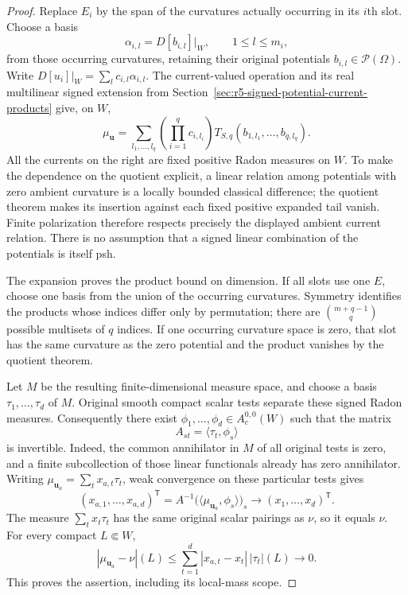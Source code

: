 \documentclass[11pt,a4paper]{article}
\numberwithin{equation}{section}
\theoremstyle{definition}
\theoremstyle{remark}
\begin{document}
\begin{proof}
Replace $E_i$ by the span of the curvatures actually occurring
in its $i$th slot.  Choose a basis
\[
       \alpha_{i,l}=D[b_{i,l}]|_W,\qquad1\le l\le m_i,
\]
from those occurring curvatures, retaining their original
potentials $b_{i,l}\in\mathcal P(\Omega)$.  Write
$D[u_i]|_W=\sum_l c_{i,l}\alpha_{i,l}$.
The current-valued operation and its real multilinear signed
extension from Section~\ref{sec:r5-signed-potential-current-products}
give, on $W$,
\begin{equation}
 \mu_{\mathbf u}
   =\sum_{l_1,\ldots,l_q}
        \left(\prod_{i=1}^q c_{i,l_i}\right)
        T_{S,q}(b_{1,l_1},\ldots,b_{q,l_q}).
 \label{eq:r5-finite-curvature-expansion}
\end{equation}
All the currents on the right are fixed positive Radon
measures on $W$.  To make the dependence on the quotient
explicit, a linear relation among potentials with zero
ambient curvature is a locally bounded classical difference;
the quotient theorem makes its insertion against each fixed
positive expanded tail vanish.  Finite polarization therefore
respects precisely the displayed ambient current relation.
There is no assumption that a signed linear combination of
the potentials is itself psh.

The expansion proves the product bound on dimension.  If all
slots use one $E$, choose one basis from the union of the
occurring curvatures.  Symmetry identifies the products whose
indices differ only by permutation; there are
$\binom{m+q-1}{q}$ possible multisets of $q$ indices.
If one occurring curvature space is zero, that slot has the
same curvature as the zero potential and the product vanishes
by the quotient theorem.

Let $M$ be the resulting finite-dimensional measure space,
and choose a basis $\tau_1,\ldots,\tau_d$ of $M$.
Original smooth compact scalar tests separate these signed
Radon measures.  Consequently there exist
$\phi_1,\ldots,\phi_d\in A_c^{0,0}(W)$ such that the matrix
\[
                   A_{st}=\langle\tau_t,\phi_s\rangle
\]
is invertible.  Indeed, the common annihilator in $M$ of all
original tests is zero, and a finite subcollection of those
linear functionals already has zero annihilator.
Writing $\mu_{\mathbf u_a}=\sum_t x_{a,t}\tau_t$, weak
convergence on these particular tests gives
\[
 (x_{a,1},\ldots,x_{a,d})^{\mathsf T}
   =A^{-1}\bigl(\langle\mu_{\mathbf u_a},\phi_s\rangle\bigr)_s
          \longrightarrow (x_1,\ldots,x_d)^{\mathsf T}.
\]
The measure $\sum_t x_t\tau_t$ has the same original scalar
pairings as $\nu$, so it equals $\nu$.  For every compact
$L\Subset W$,
\[
 |\mu_{\mathbf u_a}-\nu|(L)
       \le\sum_{t=1}^d |x_{a,t}-x_t|\,|\tau_t|(L)
                   \longrightarrow0.
\]
This proves the assertion, including its local-mass scope.
\end{proof}
\end{document}
